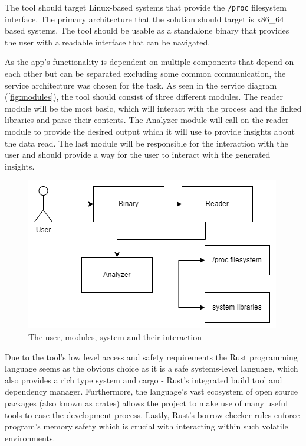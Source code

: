 
The tool should target Linux-based systems that provide the \verb|/proc| filesystem interface.
The primary architecture that the solution should target is x86\_64 based systems.
The tool should be usable as a standalone binary that provides the user with a readable interface that can be navigated.


As the app's functionality is dependent on multiple components that depend on each other but can be separated excluding some common communication, the service architecture was chosen for the task.
As seen in the service diagram (\autoref{fig:modules}), the tool should consist of three different modules.
The reader module will be the most basic, which will interact with the process and the linked libraries and parse their contents.
The Analyzer module will call on the reader module to provide the desired output which it will use to provide insights about the data read.
The last module will be responsible for the interaction with the user and should provide a way for the user to interact with the generated insights.

\begin{figure}
    \centering
    \includegraphics[width=0.5\linewidth]{modules.drawio.png}
    \caption{The user, modules, system and their interaction}
    \label{fig:modules}
\end{figure}


Due to the tool's low level access and safety requirements the Rust programming language seems as the obvious choice as it is a safe systems-level language, which also provides a rich type system and cargo - Rust's integrated build tool and dependency manager.
Furthermore, the language's vast ecosystem of open source packages (also known as crates) allows the project to make use of many useful tools to ease the development process.
Lastly, Rust's borrow checker rules \cite{rust_foundation_rust-langrust_2024} enforce program's memory safety which is crucial with interacting within such volatile environments.

